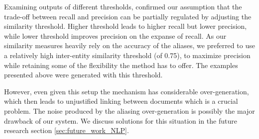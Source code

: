 Examining outputs of different thresholds, confirmed our assumption that the trade-off between recall and precision can be partially regulated by adjusting the similarity threshold. Higher threshold leads to higher recall but lower precision, while lower threshold improves precision on the expanse of recall. As our similarity measures heavily rely on the accuracy of the aliases, we preferred to use a relatively high inter-entity similarity threshold (of 0.75), to maximize precision while retaining some of the flexibility the method has to offer. The examples presented above were generated with this threshold.

However, even given this setup the mechanism has considerable over-generation, which then leads to unjustified linking between documents which is a crucial problem. The noise produced by the aliasing over-generation is possibly the major drawback of our system. We discuss solutions for this situation in the future research section \ref{sec:future_work_NLP}.


